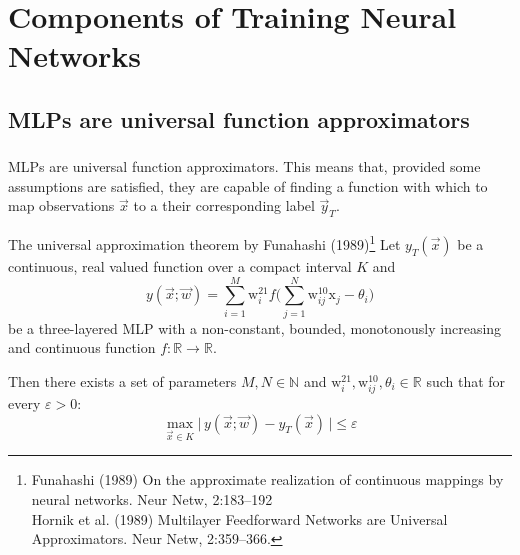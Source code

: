 \section{Components of Training Neural Networks}

\subsection{MLPs are universal function approximators}

\begin{frame}\frametitle{\subsecname}


MLPs are universal function approximators. This means that, provided some assumptions are satisfied, they are capable of finding a function with which to map observations $\vec x$ to a their corresponding label $\vec y_T$.

   \begin{block}{The universal approximation theorem by Funahashi (1989)\footnote
	{ Funahashi (1989) On the approximate realization of 
		continuous mappings by neural networks. Neur Netw, 2:183--192\\
		Hornik et al. (1989) Multilayer Feedforward Networks 
		are Universal Approximators. Neur Netw, 2:359--366. }}
	\small
    	Let $y_T{(\vec{x})}$ be a continuous, real valued function 
    	over a compact interval $K$ and     
		\begin{equation} 
		{y}{(\vec{x}; \vec w)} = \sum_{i=1}^M \mathrm{w}_i^{21} 
		f\Big( \sum\limits_{j=1}^N \mathrm{w}_{ij}^{10} 
		  \mathrm{x}_j - \theta_i \Big)
		 \end{equation}
    	be a three-layered MLP with a non-constant, bounded, 
    	monotonously increasing and continuous function 
    	$f: \mathbb{R} \rightarrow \mathbb{R}$.\\
		\vspace{4mm}
	   \pause

		Then there exists a set of parameters 
		$M, N \in \mathbb{N}$ and $\mathrm{w}_i^{21}, 
		\mathrm{w}_{ij}^{10}, \theta_i \in \mathbb{R}$ 
		such that for every $\varepsilon > 0$:
		\begin{equation}
		\max_{\vec{x} \in K} \Big| \,{y}{(\vec{x}; \vec w)} - y_T{(\vec{x})} \,\Big| 
		\leq \varepsilon
		 \end{equation}
  \end{block}
  
\end{frame}

\newpage

